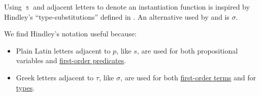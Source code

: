 \begin{remark}\label{rem:substitution_symbol}
  Using \( \Bbbs \) and adjacent letters to denote an instantiation function is inspired by Hindley's \enquote{type-substitutions} defined in \cite[def. 3A1]{Hindley1997BasicSTT}. An alternative used by  and  is \( \sigma \).

  We find Hindley's notation useful because:
  \begin{itemize}
    \item Plain Latin letters adjacent to \( p \), like \( s \), are used for both propositional variables and \hyperref[def:fol_signature/predicates]{first-order predicates}.
    \item Greek letters adjacent to \( \tau \), like \( \sigma \), are used for both \hyperref[def:fol_schema]{first-order terms} and for \hyperref[rem:type_theory]{types}.
  \end{itemize}
\end{remark}

